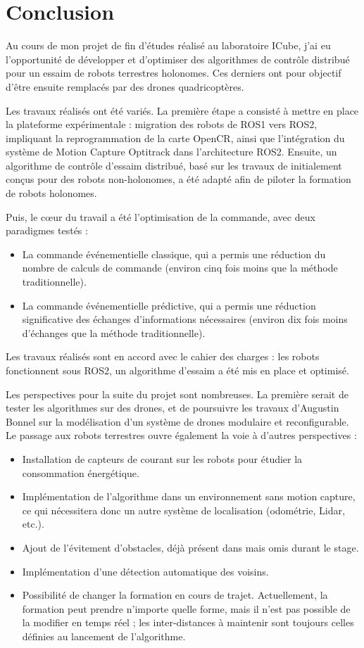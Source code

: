 \chapter{Conclusion}

Au cours de mon projet de fin d'études réalisé au laboratoire ICube, j'ai eu l'opportunité de développer et d'optimiser des algorithmes de contrôle distribué pour un essaim de robots terrestres holonomes. Ces derniers ont pour objectif d'être ensuite remplacés par des drones quadricoptères.

Les travaux réalisés ont été variés. La première étape a consisté à mettre en place la plateforme expérimentale : migration des robots de ROS1 vers ROS2, impliquant la reprogrammation de la carte OpenCR, ainsi que l'intégration du système de Motion Capture Optitrack dans l'architecture ROS2. Ensuite, un algorithme de contrôle d'essaim distribué, basé sur les travaux de \cite{koung_consensus-based_2020} initialement conçus pour des robots non-holonomes, a été adapté afin de piloter la formation de robots holonomes.

Puis, le cœur du travail a été l'optimisation de la commande, avec deux paradigmes testés :
\begin{itemize}
    \item La commande événementielle classique, qui a permis une réduction du nombre de calculs de commande (environ cinq fois moins que la méthode traditionnelle).
    \item La commande événementielle prédictive, qui a permis une réduction significative des échanges d'informations nécessaires (environ dix fois moins d'échanges que la méthode traditionnelle).
\end{itemize}
Les travaux réalisés sont en accord avec le cahier des charges : les robots fonctionnent sous ROS2, un algorithme d'essaim a été mis en place et optimisé.

Les perspectives pour la suite du projet sont nombreuses. La première serait de tester les algorithmes sur des drones, et de poursuivre les travaux d'Augustin Bonnel \cite{bonnel_modeling_2024} sur la modélisation d'un système de drones modulaire et reconfigurable. 
Le passage aux robots terrestres ouvre également la voie à d'autres perspectives : 
\begin{itemize}
    \item Installation de capteurs de courant sur les robots pour étudier la consommation énergétique.
    \item Implémentation de l'algorithme dans un environnement sans motion capture, ce qui nécessitera donc un autre système de localisation (odométrie, Lidar, etc.).
    \item Ajout de l’évitement d'obstacles, déjà présent dans \cite{koung_consensus-based_2020} mais omis durant le stage.
    \item Implémentation d'une détection automatique des voisins.
    \item Possibilité de changer la formation en cours de trajet. Actuellement, la formation peut prendre n'importe quelle forme, mais il n'est pas possible de la modifier en temps réel ; les inter-distances à maintenir sont toujours celles définies au lancement de l'algorithme.
\end{itemize}

